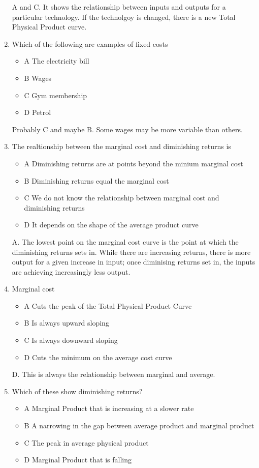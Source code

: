 \documentclass[12pt, a4paper, oneside]{article}\usepackage[]{graphicx}\usepackage[]{color}
\begin{document}
\begin{enumerate}
A and C.  It shows the relationship between inputs and outputs for a particular technology.  If the technolgoy is changed, there is a new Total Physical Product curve. 

\item Which of the following are examples of fixed costs
\begin{itemize}
\item A The electricity bill
\item B Wages
\item C Gym membership
\item D Petrol
\end{itemize}

Probably C and maybe B.  Some wages may be more variable than others. 

\item The realtionship between the marginal cost and diminishing returns is
\begin{itemize}
\item A Diminishing returns are at points beyond the minium marginal cost
\item B Diminishing returns equal the marginal cost
\item C We do not know the relationship between marginal cost and diminishing returns
\item D It depends on the shape of the average product curve
\end{itemize}

A. The lowest point on the marginal cost curve is the point at which the diminishing returns sets in.  While there are increasing returns, there is more output for a given increase in input; once diminising returns set in, the inputs are achieving increasingly less output. 

\item Marginal cost
\begin{itemize}
\item A Cuts the peak of the Total Physical Product Curve
\item B Is always upward sloping
\item C Is always downward sloping
\item D Cuts the minimum on the average cost curve
\end{itemize}

D.  This is always the relationship between marginal and average. 

\item Which of these show diminishing returns?
\begin{itemize} 
\item A Marginal Product that is increasing at a slower rate
\item B A narrowing in the gap between average product and marginal product
\item C The peak in average physical product
\item D Marginal Product that is falling
\end{itemize}


\end{enumerate}
\end{document}

